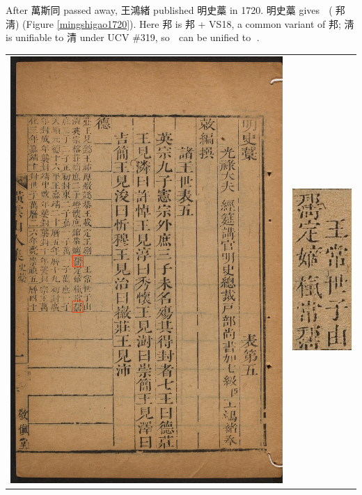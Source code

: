 \documentclass{article}
\begin{document}
After 萬斯同 passed away, 王鴻緒 published 明史藁\cite{明史藁王鴻緖} in 1720. 明史藁 gives {\huge 﫢} (⿱邦󠄁淸) (Figure \ref{mingshigao1720}). Here 邦󠄁 is 邦 + VS18, a common variant of 邦; 淸 is unifiable to 清 under UCV \#319, so 﫢 can be unified to 﫠.

\begin{center}
    \begin{tabular}{ c c }
        \includegraphics[height=.9\textheight]{24195504.png-0.pdf} & \includegraphics{24195504.png-0-crop.png}

\end{tabular}
\end{center}
\end{document}
